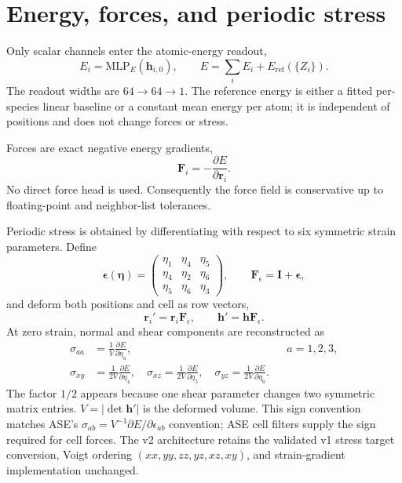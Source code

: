 \documentclass[10pt]{article}
\newcommand{\vect}[1]{\bm{#1}}
\begin{document}
\section{Energy, forces, and periodic stress}

Only scalar channels enter the atomic-energy readout,
\begin{equation}
 E_i=\mathrm{MLP}_{E}(\vect h_{i,0}),\qquad
 E=\sum_iE_i+E_{\mathrm{ref}}(\{Z_i\}).
 \label{eq:energy}
\end{equation}
The readout widths are $64\rightarrow64\rightarrow1$. The reference energy is
either a fitted per-species linear baseline or a constant mean energy per atom;
it is independent of positions and does not change forces or stress.

Forces are exact negative energy gradients,
\begin{equation}
 \vect F_i=-\frac{\partial E}{\partial\vect r_i}.
 \label{eq:force}
\end{equation}
No direct force head is used. Consequently the force field is conservative up
to floating-point and neighbor-list tolerances.

Periodic stress is obtained by differentiating with respect to six symmetric
strain parameters. Define
\begin{equation}
 \vect\epsilon(\vect\eta)=
 \begin{pmatrix}
 \eta_1&\eta_4&\eta_5\\
 \eta_4&\eta_2&\eta_6\\
 \eta_5&\eta_6&\eta_3
 \end{pmatrix},\qquad
 \vect F_{\epsilon}=\vect I+\vect\epsilon,
\end{equation}
and deform both positions and cell as row vectors,
\begin{equation}
 \vect r_i'=\vect r_i\vect F_{\epsilon},\qquad
 \vect h'=\vect h\vect F_{\epsilon}.
\end{equation}
At zero strain, normal and shear components are reconstructed as
\begin{align}
 \sigma_{aa}&=\frac{1}{V}\frac{\partial E}{\partial\eta_a},
 &&a=1,2,3,\\
 \sigma_{xy}&=\frac{1}{2V}\frac{\partial E}{\partial\eta_4},\quad
 \sigma_{xz}=\frac{1}{2V}\frac{\partial E}{\partial\eta_5},\quad
 \sigma_{yz}=\frac{1}{2V}\frac{\partial E}{\partial\eta_6}.
 \label{eq:stress}
\end{align}
The factor $1/2$ appears because one shear parameter changes two symmetric
matrix entries. $V=|\det\vect h'|$ is the deformed volume. This sign convention
matches ASE's $\sigma_{ab}=V^{-1}\partial E/\partial\epsilon_{ab}$ convention;
ASE cell filters supply the sign required for cell forces. The v2 architecture
retains the validated v1 stress target conversion, Voigt ordering
$(xx,yy,zz,yz,xz,xy)$, and strain-gradient implementation unchanged.
\end{document}
